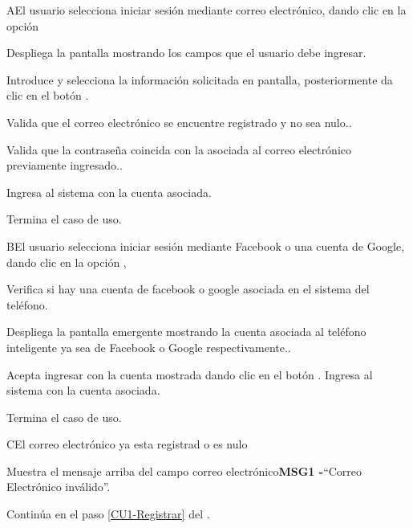 		\begin{UCtrayectoriaA}{A}{El usuario selecciona iniciar sesión mediante correo electrónico, dando clic en la opción }
			
			\UCpaso Despliega la pantalla  mostrando los campos que el usuario debe ingresar.
			
			\UCpaso[\UCactor] Introduce y selecciona la información solicitada en pantalla, posteriormente da clic en el botón .
			
			\UCpaso Valida que el correo electrónico se encuentre registrado y no sea nulo..

			\UCpaso Valida que la contraseña coincida con la asociada al correo electrónico previamente ingresado..
			
			\UCpaso Ingresa al sistema con la cuenta asociada.
			
			\UCpaso[] Termina el caso de uso.
			
		\end{UCtrayectoriaA}
		
		\begin{UCtrayectoriaA}{B}{El usuario selecciona iniciar sesión mediante Facebook o una cuenta de Google, dando clic en la opción , }
			
			\UCpaso Verifica si hay una cuenta de facebook o google asociada en el sistema del teléfono.
				
			\UCpaso Despliega la pantalla emergente  mostrando la cuenta asociada al teléfono inteligente ya sea de Facebook o Google respectivamente..
			
			\UCpaso[\UCactor] Acepta ingresar con la cuenta mostrada dando clic en el botón  .
			\UCpaso Ingresa al sistema con la cuenta asociada.
		
			\UCpaso[] Termina el caso de uso.
			
		\end{UCtrayectoriaA}

		\begin{UCtrayectoriaA}{C}{El correo electrónico ya esta registrad o es nulo}
			
			\UCpaso Muestra el mensaje arriba del campo correo electrónico{\bf MSG1 -}``Correo Electrónico inválido''.
			
			\UCpaso Continúa en el paso \ref{CU1-Registrar} del .
			
		\end{UCtrayectoriaA}

